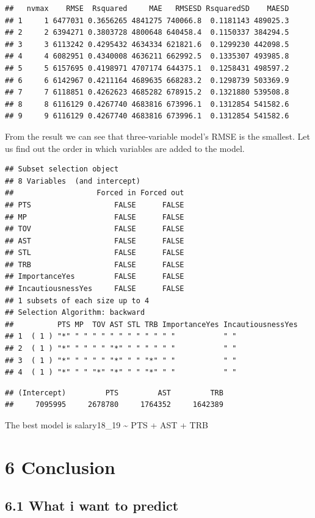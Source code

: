 \documentclass[]{article}
\begin{document}
\begin{verbatim}
##   nvmax    RMSE  Rsquared     MAE   RMSESD RsquaredSD    MAESD
## 1     1 6477031 0.3656265 4841275 740066.8  0.1181143 489025.3
## 2     2 6394271 0.3803728 4800648 640458.4  0.1150337 384294.5
## 3     3 6113242 0.4295432 4634334 621821.6  0.1299230 442098.5
## 4     4 6082951 0.4340008 4636211 662992.5  0.1335307 493985.8
## 5     5 6157695 0.4198971 4707174 644375.1  0.1258431 498597.2
## 6     6 6142967 0.4211164 4689635 668283.2  0.1298739 503369.9
## 7     7 6118851 0.4262623 4685282 678915.2  0.1321880 539508.8
## 8     8 6116129 0.4267740 4683816 673996.1  0.1312854 541582.6
## 9     9 6116129 0.4267740 4683816 673996.1  0.1312854 541582.6
\end{verbatim}

From the result we can see that three-variable model's RMSE is the
smallest. Let us find out the order in which variables are added to the
model.

\begin{verbatim}
## Subset selection object
## 8 Variables  (and intercept)
##                   Forced in Forced out
## PTS                   FALSE      FALSE
## MP                    FALSE      FALSE
## TOV                   FALSE      FALSE
## AST                   FALSE      FALSE
## STL                   FALSE      FALSE
## TRB                   FALSE      FALSE
## ImportanceYes         FALSE      FALSE
## IncautiousnessYes     FALSE      FALSE
## 1 subsets of each size up to 4
## Selection Algorithm: backward
##          PTS MP  TOV AST STL TRB ImportanceYes IncautiousnessYes
## 1  ( 1 ) "*" " " " " " " " " " " " "           " "              
## 2  ( 1 ) "*" " " " " "*" " " " " " "           " "              
## 3  ( 1 ) "*" " " " " "*" " " "*" " "           " "              
## 4  ( 1 ) "*" " " "*" "*" " " "*" " "           " "
\end{verbatim}

\begin{verbatim}
## (Intercept)         PTS         AST         TRB 
##     7095995     2678780     1764352     1642389
\end{verbatim}

The best model is salary18\_19 \textasciitilde{} PTS + AST + TRB

\section{6 Conclusion}\label{conclusion}

\subsection{6.1 What i want to predict}\label{what-i-want-to-predict}
\end{document}
